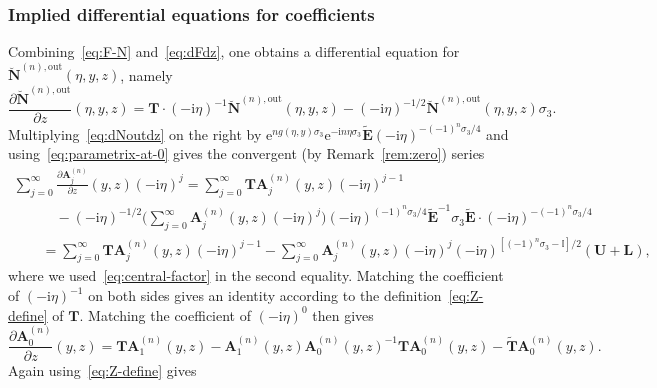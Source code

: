 \documentclass[11pt]{article}
\numberwithin{equation}{section}
\numberwithin{equation}{section}
\begin{document}
\subsubsection{Implied differential equations for coefficients}
Combining~\eqref{eq:F-N} and~\eqref{eq:dFdz}, one obtains
 a differential equation for $\breve{\mathbf{N}}^{(n),\mathrm{out}}(\eta,y,z)$, namely
 \begin{equation}
 \frac{\partial\breve{\mathbf{N}}^{(n),\mathrm{out}}}{\partial z}(\eta,y,z)=\mathbf{T}\cdot (-\mathrm{i}\eta)^{-1}\breve{\mathbf{N}}^{(n),\mathrm{out}}(\eta,y,z) - (-\mathrm{i}\eta)^{-1/2}\breve{\mathbf{N}}^{(n),\mathrm{out}}(\eta,y,z)\sigma_3.
\label{eq:dNoutdz}
\end{equation}
Multiplying~\eqref{eq:dNoutdz} on the right by $\mathrm{e}^{ng(\eta,y)\sigma_3}\mathrm{e}^{-\mathrm{i} n\eta\sigma_3}\widetilde{\mathbf{E}}(-\mathrm{i}\eta)^{-(-1)^n\sigma_3/4}$ and using~\eqref{eq:parametrix-at-0} gives the convergent (by Remark~\ref{rem:zero}) series
\begin{gather*}
\sum_{j=0}^\infty \frac{\partial\mathbf{A}^{(n)}_j}{\partial z} (y,z)(-\mathrm{i}\eta)^j
 = \sum_{j=0}^\infty \mathbf{T}\mathbf{A}^{(n)}_j(y,z)(-\mathrm{i}\eta)^{j-1} \\
\qquad\quad{} - (-\mathrm{i}\eta)^{-1/2}\Bigg(\sum_{j=0}^{\infty}\mathbf{A}_j^{(n)}(y,z) (-\mathrm{i}\eta)^j\Bigg)(-\mathrm{i}\eta)^{(-1)^n\sigma_3/4}\widetilde{\mathbf{E}}^{-1}\sigma_3\widetilde{\mathbf{E}}\cdot(-\mathrm{i}\eta)^{-(-1)^n\sigma_3/4}\\
\qquad {} = \sum_{j=0}^\infty \mathbf{T}\mathbf{A}_j^{(n)}(y,z)(-\mathrm{i}\eta)^{j-1}-\sum_{j=0}^\infty\mathbf{A}_j^{(n)}(y,z)(-\mathrm{i}\eta)^j(-\mathrm{i}\eta)^{[(-1)^n\sigma_3-\mathbb{I}]/2}(\mathbf{U}+\mathbf{L}),
\end{gather*}
where we used~\eqref{eq:central-factor} in the second equality. Matching the coefficient of $(-\mathrm{i}\eta)^{-1}$ on both sides gives an identity according to the definition~\eqref{eq:Z-define} of $\mathbf{T}$. Matching the coefficient of $(-\mathrm{i}\eta)^0$ then gives
\begin{equation*}
\frac{\partial\mathbf{A}_0^{(n)}}{\partial z}(y,z)=\mathbf{T}\mathbf{A}_1^{(n)}(y,z)-\mathbf{A}_1^{(n)}(y,z)\mathbf{A}_0^{(n)}(y,z)^{-1}\mathbf{T}\mathbf{A}_0^{(n)}(y,z) - \widetilde{\mathbf{T}}\mathbf{A}_0^{(n)}(y,z).
\end{equation*}
Again using~\eqref{eq:Z-define} gives
\end{document}
